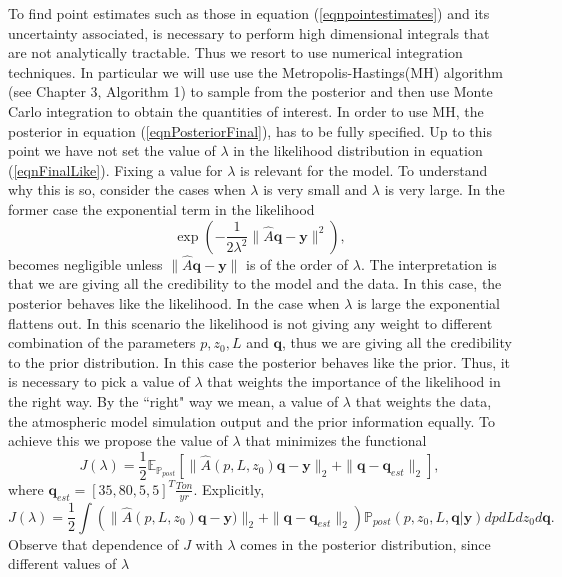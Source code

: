 \documentclass[12pt]{book}
\newcommand{\post}{\mathbb{P}_{post}}
\newcommand{\q}{\textbf{q}}
\newcommand{\pars}{p,z_{0},L}
\newcommand{\E}{\mathbb{E}} %
\newcommand{\y}{\textbf{y}}
\begin{document}
To find  point estimates such as those  in equation (\ref{eqnpointestimates}) and its uncertainty associated,  is necessary to perform  high
dimensional integrals that are not analytically tractable. Thus we resort to use numerical integration techniques. In 
particular   we will use use 
the Metropolis-Hastings(MH) algorithm (see Chapter 3, Algorithm 1) to sample from the posterior and then
use Monte Carlo integration to obtain the quantities of interest. In order to use MH, the posterior
in equation (\ref{eqnPosteriorFinal}), has to be fully specified. Up to this point we have not
set the value of $\lambda$ in the likelihood distribution in equation (\ref{eqnFinalLike}). 
Fixing a value for $\lambda$ is relevant for the model. To understand why this is so, consider
the cases when $\lambda$ is very small and $\lambda$ is very large. In the former case the exponential  term in the likelihood
\begin{equation*}
\exp\left(-\frac{1}{2\lambda^{2}}\|\widehat{A}\q-\y\|^{2}\right),
\end{equation*}
becomes negligible unless $\|\widehat{A}\q-\y\|$ is of the order of $\lambda$. The interpretation
is that we are giving all the credibility to the model and the data. In this case,
the posterior behaves like the likelihood.
In the case when $\lambda$ is large the exponential flattens out. In this scenario
the likelihood is not giving any weight to different combination of the parameters $\pars$ and $\q$,
thus we are giving all the credibility to the prior distribution.
In this case the posterior behaves like the prior. Thus, it is necessary to pick a value of 
$\lambda$ that weights the importance of the likelihood in the right way. By the ``right" way
we mean, a value of $\lambda$ that weights the data, the atmospheric model simulation output and
the prior information equally. To achieve this we propose the value of $\lambda$ that
 minimizes the functional
\begin{equation*}
J(\lambda)=\frac{1}{2}\E_{\post}\left[\|\widehat{A}(p,L,z_{0})\q-\y\|_{2}+\|\q-\q_{est}\|_{2}\right],
\end{equation*}
where $\q_{est}=[35,80,5,5]^{T}\frac{Ton}{yr}$. Explicitly,
\begin{equation}\label{eqnFunctional2Optimize}
J(\lambda)=\frac{1}{2}\int\left(\|\widehat{A}(p,L,z_{0})\q-\y)\|_{2}+\|\q-\q_{est}\|_{2}\right)\post(\pars,\q|\y)dpdLdz_{0}d\q.
\end{equation}
Observe that dependence of $J$ with $\lambda$ comes in the posterior distribution, since different values of $\lambda$
\end{document}
